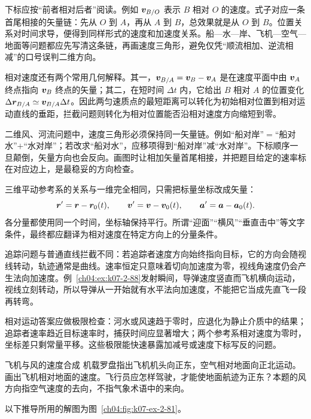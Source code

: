 {\VelocityTriangleDiagram

下标应按“前者相对后者”阅读。例如 $\bm{v}_{B/O}$ 表示 $B$ 相对 $O$ 的速度。式子对应一条首尾相接的矢量链：先从 $O$ 到 $A$，再从 $A$ 到 $B$，总效果就是从 $O$ 到 $B$。位置关系对时间求导，便得到同样形式的速度和加速度关系。船—水—岸、飞机—空气—地面等问题都应先写清这条链，再画速度三角形，避免仅凭“顺流相加、逆流相减”的口号误判二维方向。

相对速度还有两个常用几何解释。其一，$\bm{v}_{B/A}=\bm{v}_B-\bm{v}_A$ 是在速度平面中由 $\bm{v}_A$ 终点指向 $\bm{v}_B$ 终点的矢量；其二，在短时间 $\Delta t$ 内，它给出 $B$ 相对 $A$ 的位置变化 $\Delta\bm{r}_{B/A}\simeq\bm{v}_{B/A}\Delta t$。因此两匀速质点的最短距离可以转化为初始相对位置到相对运动直线的垂距，拦截问题则转化为相对位置能否沿相对速度方向缩短到零。

二维风、河流问题中，速度三角形必须保持同一矢量链。例如“船对岸”$=$“船对水”$+$“水对岸”；若改求“船对水”，应移项得到“船对岸”减“水对岸”。下标顺序一旦颠倒，矢量方向也会反向。画图时让相加矢量首尾相接，并把题目给定的速率标在对应边上，是最稳妥的方向检查。

三维平动参考系的关系与一维完全相同，只需把标量坐标改成矢量：
\begin{equation}
 \bm{r}'=\bm{r}-\bm{r}_0(t),\qquad
 \bm{v}'=\bm{v}-\bm{v}_0(t),\qquad
 \bm{a}'=\bm{a}-\bm{a}_0(t).
\end{equation}
各分量都使用同一个时间，坐标轴保持平行。所谓“迎面”“横风”“垂直击中”等文字条件，最终都应翻译为相对速度在特定方向上的分量条件。

追踪问题与普通直线拦截不同：若追踪者速度方向始终指向目标，它的方向会随视线转动，轨迹通常是曲线。速率恒定只意味着切向加速度为零，视线角速度仍会产生法向加速度。例~\ref{ch04:ex:k07-2-88}发射瞬间，导弹速度竖直而飞机横向运动，视线立刻转动，所以导弹从一开始就有水平法向加速度，不能把它当成先直飞一段再转弯。

相对运动答案应做极限检查：河水或风速趋于零时，应退化为静止介质中的结果；追踪者速率趋近目标速率时，捕获时间应显著增大；两个参考系相对速度为零时，坐标差只剩常量平移。这些极限能快速暴露加减号或速度下标写反的问题。

\begin{origexamplebox}{飞机与风的速度合成}\label{ch04:ex:k07-2-81}
机载罗盘指出飞机机头向正东，空气相对地面向正北运动。画出飞机相对地面的速度。飞行员应怎样驾驶，才能使地面航迹为正东？本题的风方向指空气速度的去向，不指气象术语中的来向。

\begin{qualityfigure}
\label{mech:04:81:q}
\end{qualityfigure}
\end{origexamplebox}
\begin{xesolution}
以下推导所用的解图为图~\ref{ch04:fig:k07-ex-2-81}。


\end{xesolution}}
